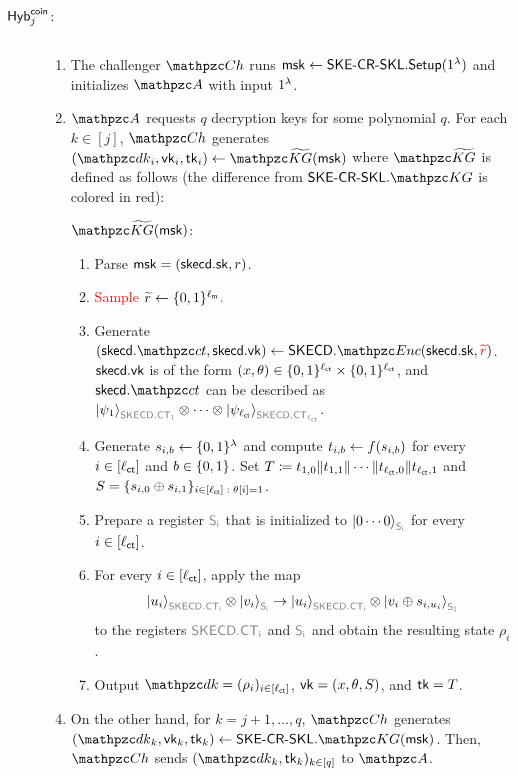 \begin{description}
\item[$\mathsf{Hyb}_{j}^{\mathsf{coin}}$:] $ $
\begin{enumerate}
\item The challenger $\qCh$ runs $\mathsf{msk} \leftarrow
\mathsf{SKE}\textrm{-}\mathsf{CR}\textrm{-}\mathsf{SKL}.\mathsf{Setup}(1^\lambda)$ 
and initializes $\qA$ with input $1^\lambda$.

\item $\qA$ requests $q$ decryption keys for some polynomial 
$q$. For each $k \in [j]$, $\qCh$ generates
$(\qdk_i,\vk_i,\tk_i) \gets \qKGt(\msk)$ where $\qKGt$ is defined 
as follows (the difference from $\SKECRSKL.\qKG$ is colored 
in red):

\item[$\qKGt(\msk)$:] $ $
\begin{enumerate}
    \item Parse $\mathsf{msk}=(\mathsf{skecd}.\mathsf{sk}, r)$.
    \item \textcolor{red}{Sample $\widetilde{r} \leftarrow
        \{0,1\}^{\ell_{\mathsf{m}}}$.}
    \item Generate
$(\skecd.\qct,\skecd.\vk)\gets\SKECD.\qEnc(\skecd.\sk,
\textcolor{red}{\widetilde{r}})$.
$\mathsf{skecd}.\mathsf{vk}$ is of the form
$(x,\theta)\in\{0,1\}^{\ell_{\mathsf{ct}}}\times\{0,1\}^{\ell_{\mathsf{ct}}}$, and $\skecd.\qct$
can be described as
$\ket{\psi_1}_{\qreg{SKECD.CT_1}}\tensor\cdots\tensor\ket{\psi_{\ctlen}}_{\qreg{SKECD.CT_{\ctlen}}}$.

    \item Generate $s_{i,b}\leftarrow\{0,1\}^\lambda$ and compute $t_{i,b}\leftarrow
        f(s_{i,b})$ for every $i\in[\ell_{\mathsf{ct}}]$ and $b\in\{0,1\}$. 
    Set $T\coloneqq t_{1,0}\|t_{1,1}\|\cdots\|t_{\ell_{\mathsf{ct}},0}\|t_{\ell_{\mathsf{ct}},1}$ and $S =
    \{s_{i,0} \oplus s_{i, 1}\}_{i \in [\ell_{\mathsf{ct}}] \; : \;\theta[i] = 1}$.
    \item Prepare a register $\qreg{S_i}$ that is initialized to $\ket{0\cdots0}_{\qreg{S_i}}$ for every $i\in[\ell_{\mathsf{ct}}]$. 
    \item For every $i\in[\ell_{\mathsf{ct}}]$, apply the map
    \begin{align}
    \ket{u_i}_{\qreg{SKECD.CT_i}}\tensor\ket{v_i}_{\qreg{S_i}}
    \ra
    \ket{u_i}_{\qreg{SKECD.CT_i}}\tensor\ket{v_i\oplus s_{i,u_i}}_{\qreg{S_1}}
    \end{align}
    to the registers $\qreg{SKECD.CT_i}$ and $\qreg{S_i}$ and obtain the resulting state $\rho_i$.
\item Output $\qdk=(\rho_i)_{i\in[\ctlen]}$, $\mathsf{vk}=(x,\theta,S)$, and $\mathsf{tk}=T$.
\end{enumerate}

\item On the other hand, for $k = j+1, \ldots, q$, $\qCh$ generates
$(\qdk_k, \vk_k,\tk_k) \gets \SKECRSKL.\qKG(\msk)$. Then,
$\qCh$ sends $(\qdk_k,\tk_k)_{k\in[q]}$ to $\qA$.


\end{enumerate}
\end{description}
